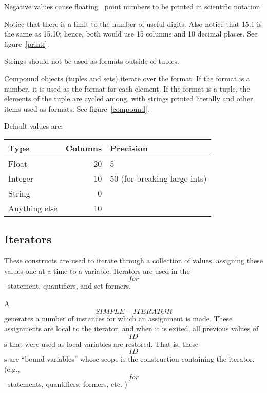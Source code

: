 {{\begin{itemize}
    Negative values cause floating\_\,point numbers to be printed
    in scientific notation.

    Notice that there is a limit to the number of useful digits.  Also
    notice that 15.1 is the same as 15.10;
    hence, both would use 15 columns and 10 decimal places.
    See figure~\ref{printf}.

    Strings should not be used as formats outside of tuples.

    Compound objects (tuples and sets) iterate over the format.
    If the format is a number,
    it is used as the format for each element.  
    If the format is a tuple,
    the elements of the tuple are cycled among,
    with strings printed literally and other items used as formats.
    See figure~\ref{compound}.

    Default values are:
    
\CS
\begin{tabular}{l r l}
    Type&	Columns&	Precision\\\hline
    Float&	20&	5\\
    Integer&	10&	50 (for breaking large ints)\\
    String&	0\\
    Anything else&	10
\end{tabular}
\CE
\end{itemize}
}

\subsection{Iterators}
These constructs are used to iterate through a collection of values,
assigning these values one at a time to a variable.
Iterators are used in the \[for\]~statement, quantifiers, and set
formers.

A \[SIMPLE-ITERATOR\] generates a number of instances for
which an assignment is made.  These assignments are
local to the iterator, and when it is exited, all
previous values of \[ID\]s that were used as local
variables are restored.  That is, these \[ID\]s are
``bound variables'' whose scope is the construction containing the
iterator.
(e.g., \[for\]~statements, quantifiers, formers, etc. )



}
